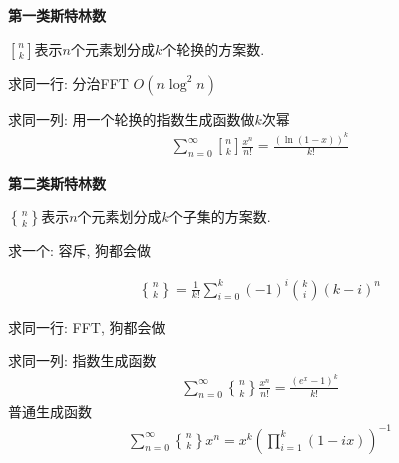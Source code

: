 \textbf{第一类斯特林数}

$n\brack k$表示$n$个元素划分成$k$个轮换的方案数.

求同一行: 分治FFT $O(n\log ^2 n)$

求同一列: 用一个轮换的指数生成函数做$k$次幂
$$\begin{aligned} \sum_{n = 0} ^ \infty {n \brack k} \frac {x ^ n} {n!} = \frac {\left(\ln (1 - x)\right) ^ k} {k!} \end{aligned}$$

\textbf{第二类斯特林数}

$n\brace k$表示$n$个元素划分成$k$个子集的方案数.

求一个: 容斥, 狗都会做

$$\begin{aligned} {n \brace k} = \frac 1 {k!} \sum_{i = 0} ^ k (-1) ^ i {k \choose i} (k - i) ^ n \end{aligned}$$

求同一行: FFT, 狗都会做

求同一列: 指数生成函数
$$\begin{aligned} \sum_{n = 0} ^ \infty {n \brace k} \frac {x ^ n} {n!} = \frac {\left(e ^ x - 1\right) ^ k} {k!} \end{aligned}$$
普通生成函数
$$\begin{aligned} \sum_{n = 0} ^ \infty {n \brace k} x ^ n = x ^ k \left(\prod_{i = 1} ^ k (1 - i x)\right) ^ {-1} \end{aligned}$$